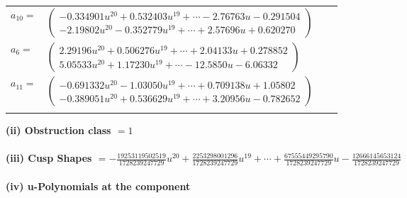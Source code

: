 \documentclass[1p]{elsarticle_modified}
\theoremstyle{definition}
\begin{document}
\begin{tabular}{m{7pt} m{180pt} m{7pt} m{180pt} }
\flushright $a_{10}=$&$\begin{pmatrix}-0.334901 u^{20}+0.532403 u^{19}+\cdots-2.76763 u-0.291504\\-2.19802 u^{20}-0.352779 u^{19}+\cdots+2.57696 u+0.620270\end{pmatrix}$ \\
\flushright $a_{6}=$&$\begin{pmatrix}2.29196 u^{20}+0.506276 u^{19}+\cdots+2.04133 u+0.278852\\5.05533 u^{20}+1.17230 u^{19}+\cdots-12.5850 u-6.06332\end{pmatrix}$ \\
\flushright $a_{11}=$&$\begin{pmatrix}-0.691332 u^{20}-1.03050 u^{19}+\cdots+0.709138 u+1.05802\\-0.389051 u^{20}+0.536629 u^{19}+\cdots+3.20956 u-0.782652\end{pmatrix}$\\&\end{tabular}
\flushleft \textbf{(ii) Obstruction class $= 1$}\\~\\
\flushleft \textbf{(iii) Cusp Shapes $= -\frac{19253119502519}{1728239247729} u^{20}+\frac{2253298001296}{1728239247729} u^{19}+\cdots+\frac{67555449295790}{1728239247729} u-\frac{12666145653124}{1728239247729}$}\\~\\
\newpage\renewcommand{\arraystretch}{1}
\flushleft \textbf{(iv) u-Polynomials at the component}\newline \\
\end{document}

